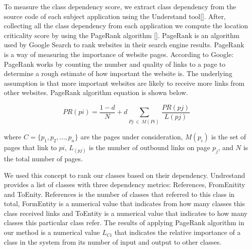 To measure the class dependency score, 
we extract class dependency from the source code of each subject application using the Understand tool[].
After, collecting all the class dependency from each application 
we compute the location criticality score by using the PageRank algorithm [].
PageRank  is an algorithm used by Google Search to rank websites 
in their search engine results. 
PageRank is a way of measuring the importance of website pages. 
According to Google: PageRank works by counting the number and 
quality of links to a page to determine a rough estimate of how important the website is. 
The underlying assumption is that more important websites are 
likely to receive more links from other websites. PageRank algorithm equation is shown below. 

\[
{PR(pi) = \frac {1-d}{N} + d 
	{\sum_{{Pj \: \in \: M(Pi) \: }}\frac {PR(pj)}{L(pj)}}}	
\]

where $C =\{p_1, p_2, ... , p_n\}$  are the pages under consideration, 
$M(p_{i})$ is the set of pages that link to $pi$, 
$L_{(pj)}$ is the number of outbound links on page $p_{j}$, and $N$ is the total number of pages.

We used this concept to rank our classes based on their dependency. 
Undrestand provides a list of classes with three dependency metrics:
References, FromEnitity and ToEnity. 
References is the number of classes that referred to this class in total, FormEntity is 
a numerical value that indicates from how many classes this class received links and
ToEntity is a numerical value that indicates to how many classes this particular class refer.  
The results of applying PageRank algorithm in our method is
a numerical value $L_{Ci}$ that indicates the relative
importance of a class in the system from its number of input and output 
to other classes. 

 







